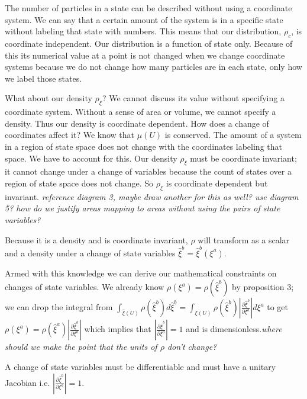 \documentclass{article}
\begin{document}
	The number of particles in a state can be described without using a coordinate system. We can say that a certain amount of the system is in a specific state without labeling that state with numbers. This means that our distribution, $\rho_c$, is coordinate independent. Our distribution is a function of state only. Because of this its numerical value at a point is not changed when we change coordinate systems because we do not change how many particles are in each state, only how we label those states. 
	
	What about our density $\rho_\xi$? We cannot discuss its value without specifying a coordinate system. Without a sense of area or volume, we cannot specify a density. Thus our density is coordinate dependent. How does a change of coordinates affect it? We know that $\mu(U)$ is conserved. The amount of a system in a region of state space does not change with the coordinates labeling that space. We have to account for this. Our density $\rho_\xi$ must be coordinate invariant; it cannot change under a change of variables because the count of states over a region of state space does not change. So $\rho_\xi$ is coordinate dependent but invariant. \emph{reference diagram 3, maybe draw another for this as well? use diagram 5? how do we justify areas mapping to areas without using the pairs of state variables?}

\begin{prop}
	Because it is a density and is coordinate invariant, $\rho$ will transform as a scalar and a density under a change of state variables $\hat{\xi}^b = \hat{\xi}^b(\xi^a)$.
\end{prop}

	Armed with this knowledge we can derive our mathematical constraints on changes of state variables. We already know $\rho(\xi^a) = \rho(\hat{\xi}^b)$ by proposition 3; we can drop the integral from $\int_{\hat{\xi}(U)} \rho(\hat{\xi}^b)d\hat{\xi}^b = \int_{\xi(U)} \rho(\hat{\xi}^b)\left|\frac{\partial\hat{\xi}^b}{\partial\xi^a}\right|d\xi^a$ to get $\rho(\xi^a) = \rho(\hat{\xi}^a)\left|\frac{\partial\hat{\xi}^b}{\partial\xi^a}\right|$ which implies that $\left|\frac{\partial\hat{\xi}^b}{\partial\xi^a}\right| = 1$ and is dimensionless.\emph{where should we make the point that the units of $\rho$ don't change?}
		
\begin{prop}
	A change of state variables must be differentiable and must have a unitary Jacobian i.e. $\left|\frac{\partial\hat{\xi}^b}{\partial\xi^a}\right| = 1$.
\end{prop}
\end{document}
